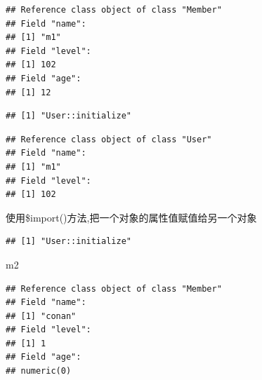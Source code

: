 \documentclass[]{book}
\newenvironment{Shaded}{\begin{snugshade}}{\end{snugshade}}
\newcommand{\KeywordTok}[1]{\textcolor[rgb]{0.13,0.29,0.53}{\textbf{#1}}}
\newcommand{\StringTok}[1]{\textcolor[rgb]{0.31,0.60,0.02}{#1}}
\newcommand{\CommentTok}[1]{\textcolor[rgb]{0.56,0.35,0.01}{\textit{#1}}}
\newcommand{\OperatorTok}[1]{\textcolor[rgb]{0.81,0.36,0.00}{\textbf{#1}}}
\newcommand{\NormalTok}[1]{#1}
\begin{document}
\begin{verbatim}
## Reference class object of class "Member"
## Field "name":
## [1] "m1"
## Field "level":
## [1] 102
## Field "age":
## [1] 12
\end{verbatim}

\begin{Shaded}
\end{Shaded}

\begin{verbatim}
## [1] "User::initialize"
\end{verbatim}

\begin{verbatim}
## Reference class object of class "User"
## Field "name":
## [1] "m1"
## Field "level":
## [1] 102
\end{verbatim}

使用\$import()方法,把一个对象的属性值赋值给另一个对象

\begin{Shaded}
\end{Shaded}

\begin{verbatim}
## [1] "User::initialize"
\end{verbatim}

\begin{Shaded}
\begin{Highlighting}[]
\NormalTok{m2}
\end{Highlighting}
\end{Shaded}

\begin{verbatim}
## Reference class object of class "Member"
## Field "name":
## [1] "conan"
## Field "level":
## [1] 1
## Field "age":
## numeric(0)
\end{verbatim}

\begin{Shaded}
\end{Shaded}
\end{document}
